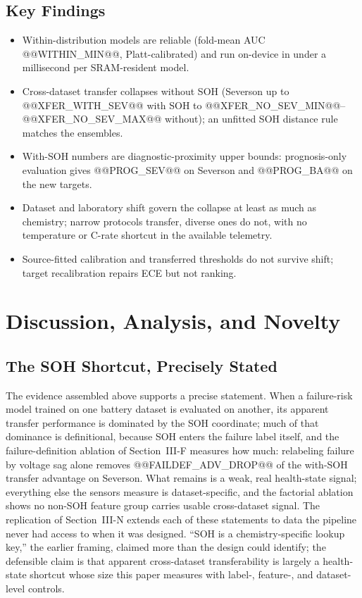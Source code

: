 \subsection{Key Findings}
\begin{itemize}
\item Within-distribution models are reliable (fold-mean AUC @@WITHIN_MIN@@, Platt-calibrated) and run on-device in under a millisecond per SRAM-resident model.
\item Cross-dataset transfer collapses without SOH (Severson up to @@XFER_WITH_SEV@@ with SOH to @@XFER_NO_SEV_MIN@@--@@XFER_NO_SEV_MAX@@ without); an unfitted SOH distance rule matches the ensembles.
\item With-SOH numbers are diagnostic-proximity upper bounds: prognosis-only evaluation gives @@PROG_SEV@@ on Severson and @@PROG_BA@@ on the new targets.
\item Dataset and laboratory shift govern the collapse at least as much as chemistry; narrow protocols transfer, diverse ones do not, with no temperature or C-rate shortcut in the available telemetry.
\item Source-fitted calibration and transferred thresholds do not survive shift; target recalibration repairs ECE but not ranking.
\end{itemize}

\section{Discussion, Analysis, and Novelty}

\subsection{The SOH Shortcut, Precisely Stated}
The evidence assembled above supports a precise statement. When a failure-risk model trained on one battery dataset is evaluated on another, its apparent transfer performance is dominated by the SOH coordinate; much of that dominance is definitional, because SOH enters the failure label itself, and the failure-definition ablation of Section~III-F measures how much: relabeling failure by voltage sag alone removes @@FAILDEF_ADV_DROP@@ of the with-SOH transfer advantage on Severson. What remains is a weak, real health-state signal; everything else the sensors measure is dataset-specific, and the factorial ablation shows no non-SOH feature group carries usable cross-dataset signal. The replication of Section~III-N extends each of these statements to data the pipeline never had access to when it was designed. ``SOH is a chemistry-specific lookup key,'' the earlier framing, claimed more than the design could identify; the defensible claim is that apparent cross-dataset transferability is largely a health-state shortcut whose size this paper measures with label-, feature-, and dataset-level controls.

